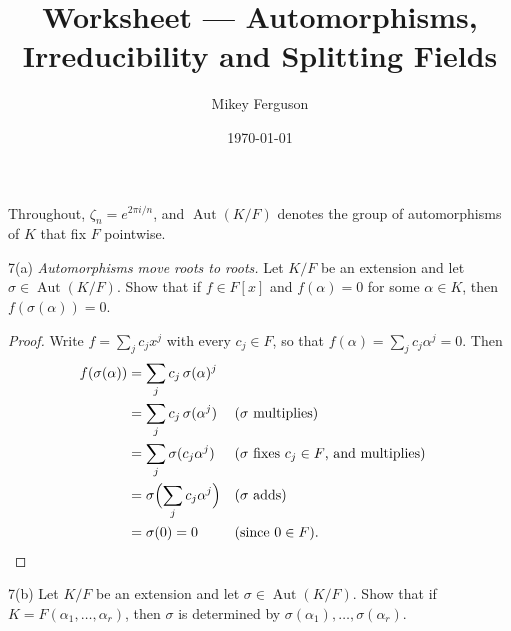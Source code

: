 \documentclass[11pt]{article}
\title{Worksheet --- Automorphisms, Irreducibility and Splitting Fields}
\author{Mikey Ferguson}
\date{\today}
\begin{document}
\maketitle

\noindent
Throughout, $\zeta_n = e^{2\pi i/n}$, and $\operatorname{Aut}(K/F)$ denotes the
group of automorphisms of $K$ that fix $F$ pointwise.


\begin{problem}{7(a)}
  \emph{Automorphisms move roots to roots.} Let $K/F$ be an extension and let
  $\sigma \in \operatorname{Aut}(K/F)$. Show that if $f \in F[x]$ and
  $f(\alpha) = 0$ for some $\alpha \in K$, then $f(\sigma(\alpha)) = 0$.
\end{problem}

\begin{proof}
Write $f = \sum_j c_j x^j$ with every $c_j \in F$, so that
$f(\alpha) = \sum_j c_j \alpha^j = 0$. Then
\begin{align*}
  f(\sigma(\alpha))
    &= \sum_j c_j\, \sigma(\alpha)^j \\
    &= \sum_j c_j\, \sigma(\alpha^j) && \text{($\sigma$ multiplies)} \\
    &= \sum_j \sigma(c_j \alpha^j) && \text{($\sigma$ fixes $c_j \in F$, and multiplies)} \\
    &= \sigma\Bigl(\sum_j c_j \alpha^j\Bigr) && \text{($\sigma$ adds)} \\
    &= \sigma(0) = 0 && \text{(since $0 \in F$)}. \qedhere
\end{align*}
\end{proof}

\begin{problem}{7(b)}
  Let $K/F$ be an extension and let $\sigma \in \operatorname{Aut}(K/F)$. Show
  that if $K = F(\alpha_1, \dots, \alpha_r)$, then $\sigma$ is determined by
  $\sigma(\alpha_1), \dots, \sigma(\alpha_r)$.
\end{problem}
\end{document}
